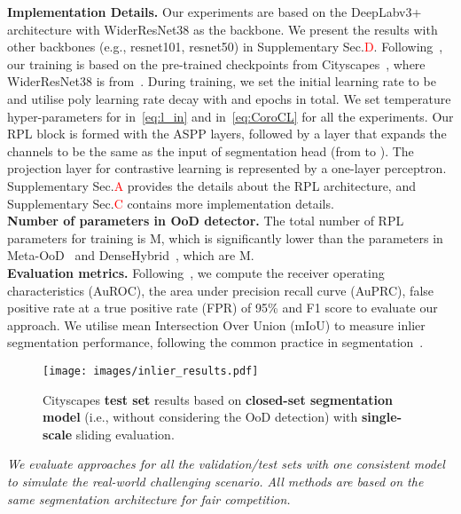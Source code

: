 \documentclass[10pt,twocolumn,letterpaper]{article}
\begin{document}
\noindent \textbf{Implementation Details.} Our experiments are based on the DeepLabv3+ architecture with WiderResNet38 as the backbone. We present the results with other backbones (e.g., resnet101, resnet50) in Supplementary Sec.\textcolor{red}{D}. Following~\cite{chan2021entropy, chan2021segmentmeifyoucan, tian2021pixel, grcic2022densehybrid}, our training is based on the pre-trained checkpoints from Cityscapes~\cite{cordts2016cityscapes}, where WiderResNet38 is from~\cite{zhu2019improving}. 
During training, we set the initial learning rate to be  and utilise poly learning rate decay with  and  epochs in total. We set temperature hyper-parameters  for  in~\eqref{eq:l_in} and  in~\eqref{eq:CoroCL} for all the experiments.
Our RPL block  is formed with the ASPP layers, followed by a layer 
that expands the channels to be the same as the input of segmentation head   (from  to ). The projection layer  for contrastive learning is represented by a
one-layer perceptron. 
Supplementary Sec.\textcolor{red}{A} provides the details about the RPL architecture, and Supplementary Sec.\textcolor{red}{C} contains more implementation details.\\
\noindent \textbf{Number of parameters in OoD detector.} The total number of RPL parameters for training is {M}, which is significantly lower than the parameters in Meta-OoD~\cite{chan2021entropy} and DenseHybrid~\cite{grcic2022densehybrid}, which are {M}.\\
\noindent \textbf{Evaluation metrics.} Following~\cite{tian2021pixel, jung2021standardized,chan2021entropy}, we compute the receiver operating characteristics (AuROC), the area under precision recall curve (AuPRC), false positive rate at a true positive rate (FPR) of 95\% and F1 score to evaluate our approach. We utilise mean Intersection Over Union (mIoU) to measure inlier segmentation performance, following the common practice in segmentation~\cite{chen2017deeplab,wang2021exploring,wang2021dense,zhao2017pyramid}. 

\begin{figure}[t!]
    \centering
    \texttt{[image: images/inlier\_results.pdf]}
    \vspace{-20 pt}
    \caption{Cityscapes \textbf{test set} results 
based on \textbf{closed-set segmentation model} (i.e., without considering the OoD detection) with \textbf{single-scale} sliding evaluation.} 
\label{fig:inlier}
    \vspace{-15 pt}
\end{figure}
\textit{We evaluate approaches for all the validation/test sets with one consistent model to simulate the real-world challenging scenario. All  methods are based on the same segmentation architecture for fair competition.}
\end{document}
